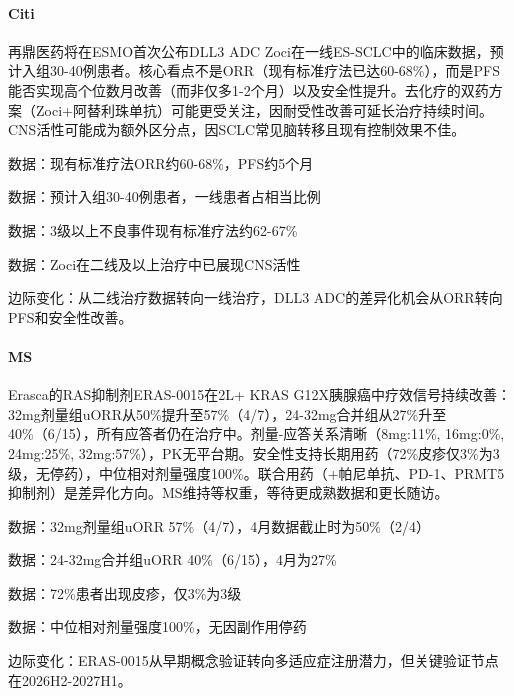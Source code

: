 \documentclass[11pt]{ctexart}
\begin{document}
\paragraph{Citi} 再鼎医药将在ESMO首次公布DLL3 ADC Zoci在一线ES-SCLC中的临床数据，预计入组30-40例患者。核心看点不是ORR（现有标准疗法已达60-68\%），而是PFS能否实现高个位数月改善（而非仅多1-2个月）以及安全性提升。去化疗的双药方案（Zoci+阿替利珠单抗）可能更受关注，因耐受性改善可延长治疗持续时间。CNS活性可能成为额外区分点，因SCLC常见脑转移且现有控制效果不佳。
{\small\color{refgray}数据：现有标准疗法ORR约60-68\%，PFS约5个月\par}
{\small\color{refgray}数据：预计入组30-40例患者，一线患者占相当比例\par}
{\small\color{refgray}数据：3级以上不良事件现有标准疗法约62-67\%\par}
{\small\color{refgray}数据：Zoci在二线及以上治疗中已展现CNS活性\par}
{\small\color{refgray}边际变化：从二线治疗数据转向一线治疗，DLL3 ADC的差异化机会从ORR转向PFS和安全性改善。\par}
\paragraph{MS} Erasca的RAS抑制剂ERAS-0015在2L+ KRAS G12X胰腺癌中疗效信号持续改善：32mg剂量组uORR从50\%提升至57\%（4/7），24-32mg合并组从27\%升至40\%（6/15），所有应答者仍在治疗中。剂量-应答关系清晰（8mg:11\%, 16mg:0\%, 24mg:25\%, 32mg:57\%），PK无平台期。安全性支持长期用药（72\%皮疹仅3\%为3级，无停药），中位相对剂量强度100\%。联合用药（+帕尼单抗、PD-1、PRMT5抑制剂）是差异化方向。MS维持等权重，等待更成熟数据和更长随访。
{\small\color{refgray}数据：32mg剂量组uORR 57\%（4/7），4月数据截止时为50\%（2/4）\par}
{\small\color{refgray}数据：24-32mg合并组uORR 40\%（6/15），4月为27\%\par}
{\small\color{refgray}数据：72\%患者出现皮疹，仅3\%为3级\par}
{\small\color{refgray}数据：中位相对剂量强度100\%，无因副作用停药\par}
{\small\color{refgray}边际变化：ERAS-0015从早期概念验证转向多适应症注册潜力，但关键验证节点在2026H2-2027H1。\par}
\end{document}
